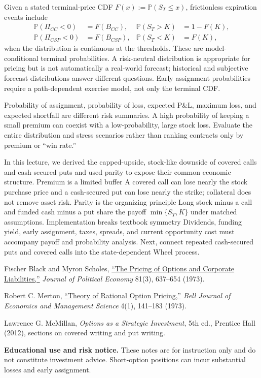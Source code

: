 \documentclass[11pt]{article}
\begin{document}
Given a stated terminal-price CDF $F(x):=\mathbb P(S_T\leq x)$, frictionless expiration events include
\begin{align}
  \label{eq:covered-call-events}
  \mathbb P(\Pi_{CC}<0)&=F(B_{CC}),
  &
  \mathbb P(S_T>K)&=1-F(K),\\
  \label{eq:csp-events}
  \mathbb P(\Pi_{CSP}<0)&=F(B_{CSP}),
  &
  \mathbb P(S_T<K)&=F(K),
\end{align}
when the distribution is continuous at the thresholds. These are model-conditional terminal probabilities. A risk-neutral distribution is appropriate for pricing but is not automatically a real-world forecast; historical and subjective forecast distributions answer different questions. Early assignment probabilities require a path-dependent exercise model, not only the terminal CDF.

Probability of assignment, probability of loss, expected P\&L, maximum loss, and expected shortfall are different risk summaries. A high probability of keeping a small premium can coexist with a low-probability, large stock loss. Evaluate the entire distribution and stress scenarios rather than ranking contracts only by premium or ``win rate.''

\Needspace{0.38\textheight}
\keytakeaways
  {In this lecture, we derived the capped-upside, stock-like downside of covered calls and cash-secured puts and used parity to expose their common economic structure.}
  {Premium is a limited buffer}
  {A covered call can lose nearly the stock purchase price and a cash-secured put can lose nearly the strike; collateral does not remove asset risk.}
  {Parity is the organizing principle}
  {Long stock minus a call and funded cash minus a put share the payoff $\min\{S_T,K\}$ under matched assumptions.}
  {Implementation breaks textbook symmetry}
  {Dividends, funding yield, early assignment, taxes, spreads, and current opportunity cost must accompany payoff and probability analysis.}
  {Next, connect repeated cash-secured puts and covered calls into the state-dependent Wheel process.}

\begin{readinglist}
  \item Fischer Black and Myron Scholes, \href{https://doi.org/10.1086/260062}{``The Pricing of Options and Corporate Liabilities,''} \emph{Journal of Political Economy} 81(3), 637--654 (1973).
  \item Robert C. Merton, \href{https://doi.org/10.2307/1831029}{``Theory of Rational Option Pricing,''} \emph{Bell Journal of Economics and Management Science} 4(1), 141--183 (1973).
  \item Lawrence G. McMillan, \emph{Options as a Strategic Investment}, 5th ed., Prentice Hall (2012), sections on covered writing and put writing.
\end{readinglist}

\vfill
{\sffamily\footnotesize\color{vnmuted}\textbf{Educational use and risk notice.} These notes are for instruction only and do not constitute investment advice. Short-option positions can incur substantial losses and early assignment.}
\end{document}
